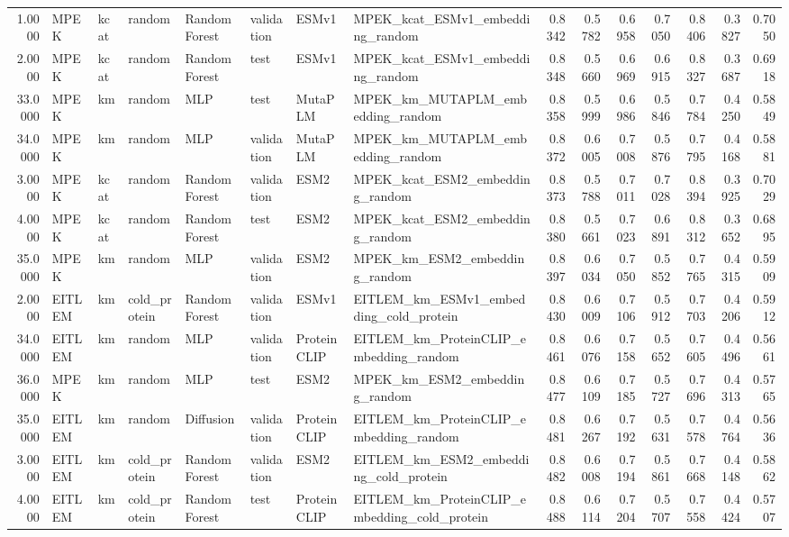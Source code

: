 \begin{tabular}{rlllllllrrrrrrr}
1.0000 & MPEK & kcat & random & Random Forest & validation & ESMv1 & MPEK_kcat_ESMv1_embedding_random & 0.8342 & 0.5782 & 0.6958 & 0.7050 & 0.8406 & 0.3827 & 0.7050 \\
2.0000 & MPEK & kcat & random & Random Forest & test & ESMv1 & MPEK_kcat_ESMv1_embedding_random & 0.8348 & 0.5660 & 0.6969 & 0.6915 & 0.8327 & 0.3687 & 0.6918 \\
33.0000 & MPEK & km & random & MLP & test & MutaPLM & MPEK_km_MUTAPLM_embedding_random & 0.8358 & 0.5999 & 0.6986 & 0.5846 & 0.7784 & 0.4250 & 0.5849 \\
34.0000 & MPEK & km & random & MLP & validation & MutaPLM & MPEK_km_MUTAPLM_embedding_random & 0.8372 & 0.6005 & 0.7008 & 0.5876 & 0.7795 & 0.4168 & 0.5881 \\
3.0000 & MPEK & kcat & random & Random Forest & validation & ESM2 & MPEK_kcat_ESM2_embedding_random & 0.8373 & 0.5788 & 0.7011 & 0.7028 & 0.8394 & 0.3925 & 0.7029 \\
4.0000 & MPEK & kcat & random & Random Forest & test & ESM2 & MPEK_kcat_ESM2_embedding_random & 0.8380 & 0.5661 & 0.7023 & 0.6891 & 0.8312 & 0.3652 & 0.6895 \\
35.0000 & MPEK & km & random & MLP & validation & ESM2 & MPEK_km_ESM2_embedding_random & 0.8397 & 0.6034 & 0.7050 & 0.5852 & 0.7765 & 0.4315 & 0.5909 \\
2.0000 & EITLEM & km & cold_protein & Random Forest & validation & ESMv1 & EITLEM_km_ESMv1_embedding_cold_protein & 0.8430 & 0.6009 & 0.7106 & 0.5912 & 0.7703 & 0.4206 & 0.5912 \\
34.0000 & EITLEM & km & random & MLP & validation & ProteinCLIP & EITLEM_km_ProteinCLIP_embedding_random & 0.8461 & 0.6076 & 0.7158 & 0.5652 & 0.7605 & 0.4496 & 0.5661 \\
36.0000 & MPEK & km & random & MLP & test & ESM2 & MPEK_km_ESM2_embedding_random & 0.8477 & 0.6109 & 0.7185 & 0.5727 & 0.7696 & 0.4313 & 0.5765 \\
35.0000 & EITLEM & km & random & Diffusion & validation & ProteinCLIP & EITLEM_km_ProteinCLIP_embedding_random & 0.8481 & 0.6267 & 0.7192 & 0.5631 & 0.7578 & 0.4764 & 0.5636 \\
3.0000 & EITLEM & km & cold_protein & Random Forest & validation & ESM2 & EITLEM_km_ESM2_embedding_cold_protein & 0.8482 & 0.6008 & 0.7194 & 0.5861 & 0.7668 & 0.4148 & 0.5862 \\
4.0000 & EITLEM & km & cold_protein & Random Forest & test & ProteinCLIP & EITLEM_km_ProteinCLIP_embedding_cold_protein & 0.8488 & 0.6114 & 0.7204 & 0.5707 & 0.7558 & 0.4424 & 0.5707 \\

\end{tabular}
